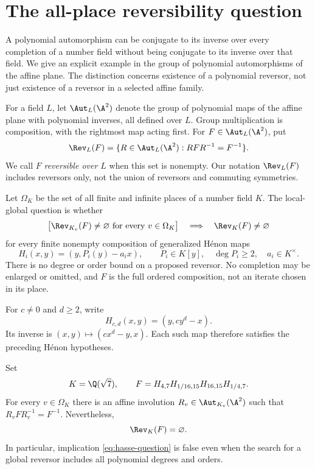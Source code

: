 \section{The all-place reversibility question}\label{sec:introduction}

A polynomial automorphism can be conjugate to its inverse over every
completion of a number field without being conjugate to its inverse
over that field. We give an explicit example in the group of polynomial
automorphisms of the affine plane. The distinction concerns existence
of a polynomial reversor, not just existence of a reversor in a selected
affine family.

For a field $L$, let $\Aut_L(\A^2)$ denote the group of polynomial maps
of the affine plane with polynomial inverses, all defined over $L$.
Group multiplication is composition, with the rightmost map acting
first. For $F\in\Aut_L(\A^2)$, put
\[
  \Rev_L(F)=
  \{R\in\Aut_L(\A^2):RFR^{-1}=F^{-1}\}.
\]
We call $F$ \emph{reversible over $L$} when this set is nonempty.
Our notation $\Rev_L(F)$ includes reversors only, not the union of
reversors and commuting symmetries.

Let $\Omega_K$ be the set of all finite and infinite places of a
number field $K$. The local-global question is whether
\begin{equation}\label{eq:hasse-question}
  \bigl[\Rev_{K_v}(F)\ne\varnothing
       \text{ for every }v\in\Omega_K\bigr]
  \quad\Longrightarrow\quad
  \Rev_K(F)\ne\varnothing
\end{equation}
for every finite nonempty composition of generalized H\'enon maps
\[
  H_i(x,y)=(y,P_i(y)-a_i x),\qquad
  P_i\in K[y],\quad \deg P_i\ge2,\quad a_i\in K^\times.
\]
There is no degree or order bound on a proposed reversor. No completion
may be enlarged or omitted, and $F$ is the full ordered composition,
not an iterate chosen in its place.

For $c\ne0$ and $d\ge2$, write
\begin{equation}\label{eq:hcd}
  H_{c,d}(x,y)=(y,cy^d-x).
\end{equation}
Its inverse is $(x,y)\mapsto(cx^d-y,x)$.
Each such map therefore satisfies the preceding H\'enon hypotheses.

\begin{theorem}\label{thm:counterexample}
Set
\begin{equation}\label{eq:counterexample}
  K=\Q(\sqrt7),\qquad
  F=H_{4,7}H_{1/16,15}H_{16,15}H_{1/4,7}.
\end{equation}
For every $v\in\Omega_K$ there is an affine involution
$R_v\in\Aut_{K_v}(\A^2)$ such that $R_vFR_v^{-1}=F^{-1}$.
Nevertheless,
\[
  \Rev_K(F)=\varnothing.
\]
In particular, implication \eqref{eq:hasse-question} is false even when
the search for a global reversor includes all polynomial degrees and
orders.
\end{theorem}

